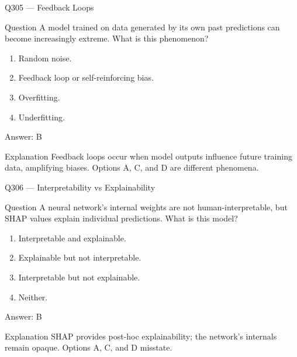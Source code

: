 \documentclass[aspectratio=169,8pt]{beamer}
\begin{document}
\begin{frame}{Q305 --- Feedback Loops}
\begin{block}{Question}
A model trained on data generated by its own past predictions can become increasingly extreme. What is this phenomenon?
\begin{enumerate}
\item Random noise.
\item Feedback loop or self-reinforcing bias.
\item Overfitting.
\item Underfitting.
\end{enumerate}\end{block}
\begin{exampleblock}{Answer: B}\end{exampleblock}
\begin{block}{Explanation}
Feedback loops occur when model outputs influence future training data, amplifying biases. Options A, C, and D are different phenomena.
\end{block}
\end{frame}

\begin{frame}{Q306 --- Interpretability vs Explainability}
\begin{block}{Question}
A neural network's internal weights are not human-interpretable, but SHAP values explain individual predictions. What is this model?
\begin{enumerate}
\item Interpretable and explainable.
\item Explainable but not interpretable.
\item Interpretable but not explainable.
\item Neither.
\end{enumerate}\end{block}
\begin{exampleblock}{Answer: B}\end{exampleblock}
\begin{block}{Explanation}
SHAP provides post-hoc explainability; the network's internals remain opaque. Options A, C, and D misstate.
\end{block}
\end{frame}
\end{document}
